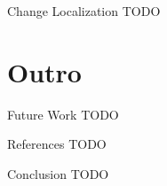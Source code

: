 
\begin{frame}{Change Localization}
  TODO
\end{frame}



\section*{Outro}

\begin{frame}{Future Work}
  TODO
\end{frame}


\begin{frame}{References}
  TODO
\end{frame}


\begin{frame}{Conclusion}
  TODO
\end{frame}



